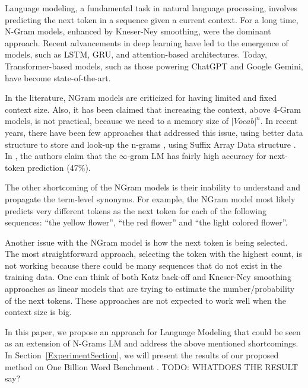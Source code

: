   Language modeling, a fundamental task in natural language processing, involves predicting the next token in a sequence given a current context. For a long time, N-Gram models, enhanced by Kneser-Ney smoothing, were the dominant approach. Recent advancements in deep learning have led to the emergence of models, such as LSTM, GRU, and attention-based architectures. Today, Transformer-based models, such as those powering ChatGPT and Google Gemini, have become state-of-the-art.
 
  In the literature, NGram models are criticized for having limited and fixed context size. Also, it has been claimed that increasing the context, above 4-Gram models, is not practical, because we need to a memory size of $|Vocab|^n$. In recent years, there have been few approaches that addressed this issue, using better data structure to store and look-up the n-grams \citep{pauls2011faster}, using Suffix Array Data structure \citep{manber1993suffix}. In \citep{liu2024infini}, the authors claim that the $\infty$-gram LM has fairly high accuracy for next-token prediction (47\%). 

  The other shortcoming of the NGram models is their inability to understand and propagate the term-level synonyms. For example, the NGram model most likely predicts very different tokens as the next token for each of the following sequences: “the yellow flower”, “the red flower” and “the light colored flower”.

  Another issue with the NGram model is how the next token is being selected. The most straightforward approach, selecting the token with the highest count, is not working because there could be many sequences that do not exist in the training data. One can think of both Katz back-off\citep{katz1987estimation} and Kneser-Ney smoothing\citep{kneser1995improved} approaches as linear models that are trying to estimate the number/probability of the next tokens. These approaches are not expected to work well when the context size is big.

In this paper, we propose an approach for Language Modeling that could be seen as an extension of N-Grams LM and address the above mentioned shortcomings. In Section~\ref{ExperimentSection}, we will present the results of our proposed method on One Billion Word Benchment \citep{chelba2013one}. TODO: WHATDOES THE RESULT say?

 
%
%

